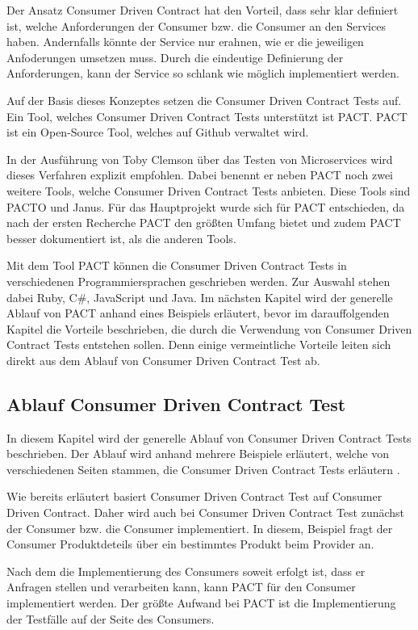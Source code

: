\documentclass{llncs}
\begin{document}
Der Ansatz Consumer Driven Contract hat den Vorteil, dass sehr klar definiert ist, welche Anforderungen der Consumer bzw. die Consumer an den Services haben. Andernfalls könnte der Service nur erahnen, wie er die jeweiligen Anfoderungen umsetzen muss. Durch die eindeutige Definierung der Anforderungen, kann der Service so schlank wie möglich implementiert werden.   

Auf der Basis dieses Konzeptes setzen die Consumer Driven Contract Tests auf. Ein Tool, welches Consumer Driven Contract Tests unterstützt ist PACT. PACT ist ein Open-Source Tool, welches auf Github verwaltet wird.

In der Ausführung von Toby Clemson über das Testen von Microservices wird dieses Verfahren explizit empfohlen. Dabei benennt er neben PACT noch zwei weitere Tools, welche Consumer Driven Contract Tests anbieten. Diese Tools sind PACTO und Janus. Für das Hauptprojekt wurde sich für PACT entschieden, da nach der ersten Recherche PACT den größten Umfang bietet und zudem PACT besser dokumentiert ist, als die anderen Tools.

Mit dem Tool PACT können die Consumer Driven Contract Tests in verschiedenen Programmiersprachen geschrieben werden. Zur Auswahl stehen dabei Ruby, C\#, JavaScript und Java. Im nächsten Kapitel wird der generelle Ablauf von PACT anhand eines Beispiels erläutert, bevor im darauffolgenden Kapitel die Vorteile beschrieben, die durch die Verwendung von Consumer Driven Contract Tests entstehen sollen. Denn einige vermeintliche Vorteile leiten sich direkt aus dem Ablauf von Consumer Driven Contract Test ab.

\subsection{Ablauf Consumer Driven Contract Test}
In diesem Kapitel wird der generelle Ablauf von Consumer Driven Contract Tests beschrieben. Der Ablauf wird anhand mehrere Beispiele erläutert, welche von verschiedenen Seiten stammen, die Consumer Driven Contract Tests erläutern \cite{bayer2015jaxcenter, vitz2016inno, Vincent2015}.

Wie bereits erläutert basiert Consumer Driven Contract Test auf Consumer Driven Contract. Daher wird auch bei Consumer Driven Contract Test zunächst der Consumer bzw. die Consumer implementiert. In diesem, Beispiel fragt der Consumer Produktdeteils über ein bestimmtes Produkt beim Provider an.

Nach dem die Implementierung des Consumers soweit erfolgt ist, dass er Anfragen stellen und verarbeiten kann, kann PACT für den Consumer implementiert werden. Der größte Aufwand bei PACT ist die Implementierung der Testfälle auf der Seite des Consumers.
\end{document}
